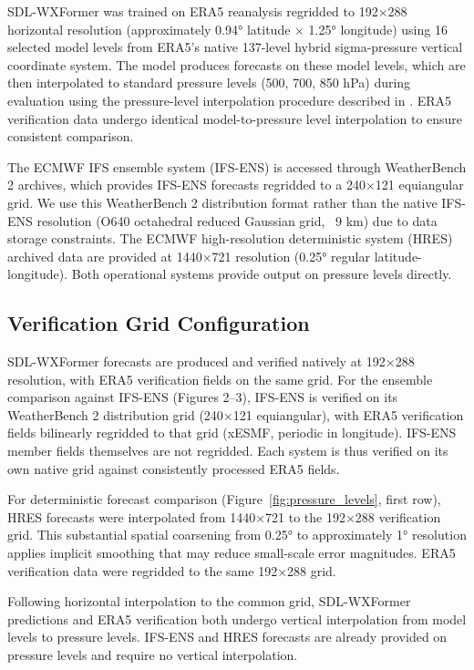 \documentclass{agujournal2019}
\begin{document}
SDL-WXFormer was trained on ERA5 reanalysis regridded to 192×288 horizontal resolution (approximately 0.94° latitude × 1.25° longitude) using 16 selected model levels from ERA5's native 137-level hybrid sigma-pressure vertical coordinate system. The model produces forecasts on these model levels, which are then interpolated to standard pressure levels (500, 700, 850 hPa) during evaluation using the pressure-level interpolation procedure described in \cite{schreck2025}. ERA5 verification data undergo identical model-to-pressure level interpolation to ensure consistent comparison.

The ECMWF IFS ensemble system (IFS-ENS) is accessed through WeatherBench 2 archives, which provides IFS-ENS forecasts regridded to a 240×121 equiangular grid. We use this WeatherBench 2 distribution format rather than the native IFS-ENS resolution (O640 octahedral reduced Gaussian grid, ~9 km) due to data storage constraints. The ECMWF high-resolution deterministic system (HRES) archived data are provided at 1440×721 resolution (0.25° regular latitude-longitude). Both operational systems provide output on pressure levels directly.

\subsection{Verification Grid Configuration}

SDL-WXFormer forecasts are produced and verified natively at 192×288 resolution, with ERA5 verification fields on the same grid. For the ensemble comparison against IFS-ENS (Figures 2–3), IFS-ENS is verified on its WeatherBench 2 distribution grid (240×121 equiangular), with ERA5 verification fields bilinearly regridded to that grid (xESMF, periodic in longitude). IFS-ENS member fields themselves are not regridded. Each system is thus verified on its own native grid against consistently processed ERA5 fields.

For deterministic forecast comparison (Figure~\ref{fig:pressure_levels}, first row), HRES forecasts were interpolated from 1440×721 to the 192×288 verification grid. This substantial spatial coarsening from 0.25° to approximately 1° resolution applies implicit smoothing that may reduce small-scale error magnitudes. ERA5 verification data were regridded to the same 192×288 grid.

Following horizontal interpolation to the common grid, SDL-WXFormer predictions and ERA5 verification both undergo vertical interpolation from model levels to pressure levels. IFS-ENS and HRES forecasts are already provided on pressure levels and require no vertical interpolation.
\end{document}
